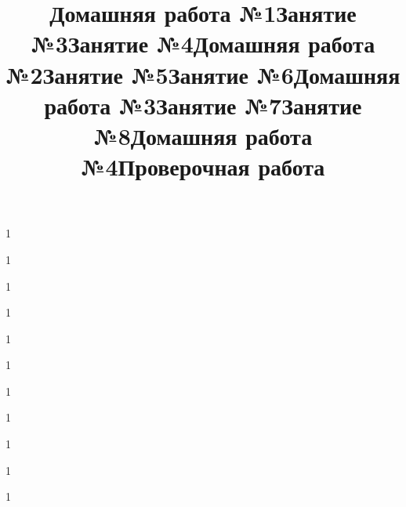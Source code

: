 \newpage
\title{Домашняя работа №1}
\begin{listofex}
	\item 1
\end{listofex}
\newpage
\title{Занятие №3}
\begin{listofex}
	\item 1
\end{listofex}
\newpage
\title{Занятие №4}
\begin{listofex}
	\item 1
\end{listofex}
\newpage
\title{Домашняя работа №2}
\begin{listofex}
	\item 1
\end{listofex}
\newpage
\title{Занятие №5}
\begin{listofex}
	\item 1
\end{listofex}
\newpage
\title{Занятие №6}
\begin{listofex}
	\item 1
\end{listofex}
\newpage
\title{Домашняя работа №3}
\begin{listofex}
	\item 1
\end{listofex}
\newpage
\title{Занятие №7}
\begin{listofex}
	\item 1
\end{listofex}
\newpage
\title{Занятие №8}
\begin{listofex}
	\item 1
\end{listofex}
\newpage
\title{Домашняя работа №4}
\begin{listofex}
	\item 1
\end{listofex}
\newpage
\title{Проверочная работа}
\begin{listofex}
	\item 1
\end{listofex}